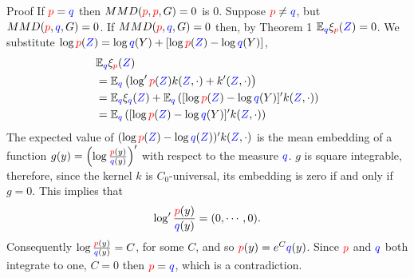 \begin{frame}
\begin{columns}
\begin{column}{.33\linewidth}
\vspace{-0.75cm}
\begin{block}{Proof}
 If ${ \color{red} p}={ \color{blue} q}$ then $MMD({\color{red} p},{ \color{red} p},G) =0$ is $0$. Suppose
${ \color{red} p}\neq { \color{blue} q}$, but $MMD({\color{red} p},{ \color{blue} q},G) =0$. If $MMD({\color{red} p},{ \color{blue} q},G) =0$ then, by Theorem 1 
$\mathbb{E}_{{ \color{blue} q}}\xi_{{ \color{red} p}}({ \color{blue} Z})=0$. We substitute $\log { \color{red} p}({ \color{blue} Z})=\log { \color{blue} q}(Y)+[\log { \color{red} p}({ \color{blue} Z})-\log { \color{blue} q}(Y)]$,
\begin{align*}
 & \mathbb{E}_{{ \color{blue} q}}\xi_{{ \color{red} p}}({ \color{blue} Z})\\
 & =\mathbb{E}_{{ \color{blue} q}}\left( \log' { \color{red} p}({ \color{blue} Z})k({ \color{blue} Z},\cdot)+ k'({ \color{blue} Z},\cdot)\right)\\
 & =\mathbb{E}_{{ \color{blue} q}}\xi_{{ \color{blue} q}}({ \color{blue} Z})+\mathbb{E}_{{ \color{blue} q}}\left([\log { \color{red} p}({ \color{blue} Z})-\log { \color{blue} q}(Y)]'k({ \color{blue} Z},\cdot)\right)\\
 & =\mathbb{E}_{{ \color{blue} q}}\left( [\log { \color{red} p}({ \color{blue} Z})-\log { \color{blue} q}(Y)]' k({ \color{blue} Z},\cdot)\right)
\end{align*}
The expected value of $(\log { \color{red} p}({ \color{blue} Z})-\log { \color{blue} q}({ \color{blue} Z}))' k({ \color{blue} Z},\cdot)$ is the mean embedding of
a function $g(y)=\left(\log\frac{{ \color{red} p}(y)}{{ \color{blue} q}(y)}\right)'$ with respect
to the measure ${ \color{blue} q}$.  $g$ is square integrable,
therefore, since the kernel $k$ is $C_0$-universal, %
its embedding is zero if and only if $g=0$. This implies that 
\[
\log'\frac{{ \color{red} p}(y)}{{ \color{blue} q}(y)}=(0,\cdots,0).
\]
Consequently  $\log\frac{{ \color{red} p}(y)}{{ \color{blue} q}(y)}=C$, for some $C$, and so  ${ \color{red} p}(y)=e^{C}{ \color{blue} q}(y)$. Since ${ \color{red} p}$ and ${ \color{blue} q}$ both integrate
to one, $C=0$ then ${ \color{red} p}={ \color{blue} q}$, which is a contradiction.
\end{block}


\end{column}
\end{columns}
\end{frame}
